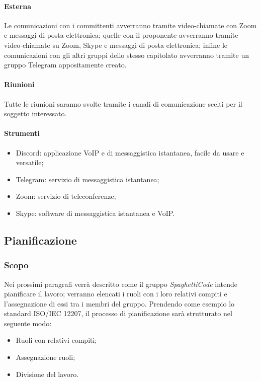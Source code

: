 \paragraph{Esterna}

Le comunicazioni con i committenti avverranno tramite video-chiamate con Zoom e messaggi di posta elettronica; 
quelle con il proponente avverranno tramite video-chiamate su Zoom, Skype e messaggi di posta elettronica; infine 
le comunicazioni con gli altri gruppi dello stesso capitolato avverranno tramite un gruppo Telegram appositamente 
creato.

\paragraph{Riunioni}

Tutte le riunioni saranno svolte tramite i canali di comunicazione scelti per il soggetto interessato. 

\paragraph{Strumenti}

\begin{itemize}
    \item Discord: applicazione VoIP e di messaggistica istantanea, facile da usare e versatile;
    \item Telegram: servizio di messaggistica istantanea;
    \item Zoom: servizio di teleconferenze;
    \item Skype: software di messaggistica istantanea e VoIP.
\end{itemize}

\subsection{Pianificazione}

\subsubsection{Scopo}

Nei prossimi paragrafi verrà descritto come il gruppo \emph{SpaghettiCode} intende pianificare il lavoro; verranno 
elencati i ruoli con i loro relativi compiti e l'assegnazione di essi tra i membri del gruppo. Prendendo come esempio 
lo standard ISO/IEC 12207, il processo di pianificazione sarà strutturato nel seguente modo:
\begin{itemize}
    \item Ruoli con relativi compiti;
    \item Assegnazione ruoli;
    \item Divisione del lavoro.
\end{itemize}

